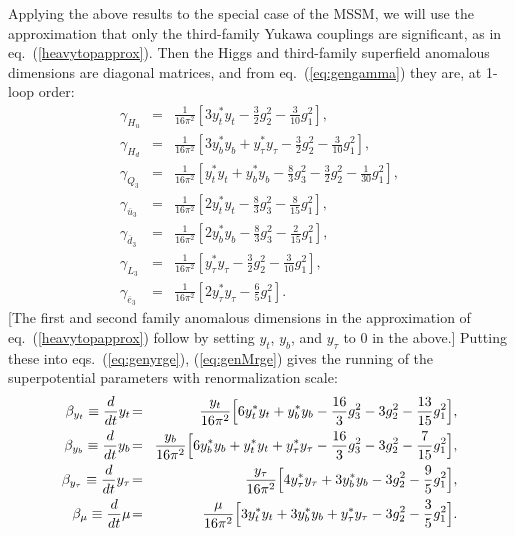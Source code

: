 \documentclass[12pt]{article}
\def\beq{\begin{eqnarray}}
\def\eeq{\end{eqnarray}}
\def\sbar{\overline}
\begin{document}
Applying the above results to the special case of the MSSM, we will use the 
approximation that only the third-family Yukawa
couplings are significant, as in eq.~(\ref{heavytopapprox}). Then the
Higgs and third-family superfield anomalous dimensions are diagonal
matrices, and from eq.~(\ref{eq:gengamma}) they are, at 1-loop
order: 
\beq
\gamma_{H_u} \!&=&\! 
\frac{1}{16 \pi^2} \left [
3 y_t^* y_t - \frac{3}{2} g_2^2 - \frac{3}{10} g_1^2
\right ],
\label{eq:gammaHu}
\\
\gamma_{H_d} \!&=&\! \frac{1}{16 \pi^2} \left [
3 y_b^* y_b + y_\tau^* y_\tau - \frac{3}{2} g_2^2 
- \frac{3}{10} g_1^2
\right ],
\\
\gamma_{Q_3} \!&=&\! \frac{1}{16 \pi^2} \left [
y_t^* y_t + y_b^* y_b - \frac{8}{3} g_3^2
- \frac{3}{2} g_2^2 - \frac{1}{30} g_1^2
\right ],
\\
\gamma_{\sbar{u}_3} \!&=&\! \frac{1}{16 \pi^2} \left [
2 y_t^* y_t  -\frac{8}{3} g_3^2 -\frac{8}{15} 
g_1^2
\right ],
\\
\gamma_{\sbar{d}_3} \!&=&\! \frac{1}{16 \pi^2} \left [
2 y_b^* y_b  -\frac{8}{3} g_3^2 -\frac{2}{15} 
g_1^2
\right ],
\\
\gamma_{L_3} \!&=&\! \frac{1}{16 \pi^2} \left [
y_\tau^* y_\tau - \frac{3}{2} g_2^2 - \frac{3}{10} 
g_1^2
\right ],
\\
\gamma_{\sbar{e}_3} \!&=&\! \frac{1}{16 \pi^2} \left [
2 y_\tau^* y_\tau  -\frac{6}{5} g_1^2
\right ].
\label{eq:gammae}
\eeq
[The first and second family anomalous dimensions in the approximation of
eq.~(\ref{heavytopapprox}) follow by setting $y_t$, $y_b$, and $y_\tau$ to
$0$ in the above.] Putting these into eqs.~(\ref{eq:genyrge}),
(\ref{eq:genMrge}) gives the running of the superpotential parameters with
renormalization scale:
\beq
\beta_{y_t} \equiv
{d\over dt} y_t \!&=&\! {y_t \over 16 \pi^2} \Bigl [ 6 y_t^* y_t + y_b^* y_b
- {16\over 3} g_3^2 - 3 g_2^2 - {13\over 15} g_1^2 \Bigr ],
\label{eq:betayt}
\\
\beta_{y_b} \equiv
{d\over dt} y_b \!&=&\! {y_b \over 16 \pi^2} 
\Bigl [ 6 y_b^* y_b + y_t^* y_t + 
y_\tau^* y_\tau - {16\over 3} g_3^2 - 3 g_2^2 - {7\over 15} g_1^2 \Bigr ],
\\
\beta_{y_\tau} \equiv
{d\over dt} y_\tau \!&=&\! {y_\tau \over 16 \pi^2} 
\Bigl [ 4 y_\tau^* y_\tau 
+ 3 y_b^* y_b - 3 g_2^2 - {9\over 5} g_1^2 \Bigr ],
\\
\beta_{\mu} \equiv
{d\over dt} \mu \!&=&\! {\mu \over 16 \pi^2} 
\Bigl [ 3 y_t^* y_t + 3 y_b^* y_b
+ y_\tau^* y_\tau - 3 g_2^2 - {3\over 5} g_1^2 \Bigr ].
\label{eq:betamu}
\eeq
\end{document}
